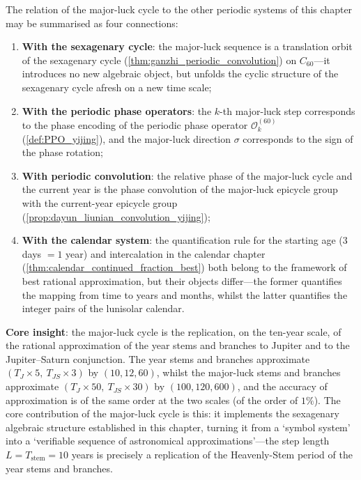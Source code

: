 \begin{remark}\label{rem:dayun_relation_to_yijing}
The relation of the major-luck cycle to the other periodic systems of this chapter may be summarised as four connections:
\begin{enumerate}[label=(\roman*)]
    \item \textbf{With the sexagenary cycle}: the major-luck sequence is a translation orbit of the sexagenary cycle (\cref{thm:ganzhi_periodic_convolution}) on $C_{60}$---it introduces no new algebraic object, but unfolds the cyclic structure of the sexagenary cycle afresh on a new time scale;
    \item \textbf{With the periodic phase operators}: the $k$-th major-luck step corresponds to the phase encoding of the periodic phase operator $\mathcal O_k^{(60)}$ (\cref{def:PPO_yijing}), and the major-luck direction $\sigma$ corresponds to the sign of the phase rotation;
    \item \textbf{With periodic convolution}: the relative phase of the major-luck cycle and the current year is the phase convolution of the major-luck epicycle group with the current-year epicycle group (\cref{prop:dayun_liunian_convolution_yijing});
    \item \textbf{With the calendar system}: the quantification rule for the starting age ($3$ days $=1$ year) and intercalation in the calendar chapter (\cref{thm:calendar_continued_fraction_best}) both belong to the framework of best rational approximation, but their objects differ---the former quantifies the mapping from time to years and months, whilst the latter quantifies the integer pairs of the lunisolar calendar.
\end{enumerate}

\textbf{Core insight}: the major-luck cycle is the replication, on the ten-year scale, of the rational approximation of the year stems and branches to Jupiter and to the Jupiter--Saturn conjunction. The year stems and branches approximate $(T_J\times 5,\ T_{JS}\times 3)$ by $(10,12,60)$, whilst the major-luck stems and branches approximate $(T_J\times 50,\ T_{JS}\times 30)$ by $(100,120,600)$, and the accuracy of approximation is of the same order at the two scales (of the order of $1\%$). The core contribution of the major-luck cycle is this: it implements the sexagenary algebraic structure established in this chapter, turning it from a `symbol system' into a `verifiable sequence of astronomical approximations'---the step length $L=T_{\text{stem}}=10$ years is precisely a replication of the Heavenly-Stem period of the year stems and branches.
\end{remark}

